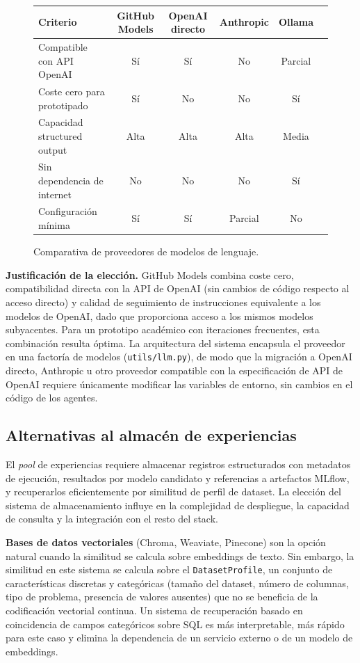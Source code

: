 \begin{figure}[H]
\centering
\begin{tabular}{lccccc}
\hline
\textbf{Criterio} & \textbf{GitHub Models} & \textbf{OpenAI directo} & \textbf{Anthropic} & \textbf{Ollama} \\
\hline
Compatible con API OpenAI & Sí & Sí & No & Parcial \\
Coste cero para prototipado & Sí & No & No & Sí \\
Capacidad structured output & Alta & Alta & Alta & Media \\
Sin dependencia de internet & No & No & No & Sí \\
Configuración mínima & Sí & Sí & Parcial & No \\
\hline
\end{tabular}
\caption{Comparativa de proveedores de modelos de lenguaje.}
\label{tab:alt-proveedor}
\end{figure}

\textbf{Justificación de la elección.} GitHub Models combina coste cero, compatibilidad directa con la API de OpenAI (sin cambios de código respecto al acceso directo) y calidad de seguimiento de instrucciones equivalente a los modelos de OpenAI, dado que proporciona acceso a los mismos modelos subyacentes. Para un prototipo académico con iteraciones frecuentes, esta combinación resulta óptima. La arquitectura del sistema encapsula el proveedor en una factoría de modelos (\texttt{utils/llm.py}), de modo que la migración a OpenAI directo, Anthropic u otro proveedor compatible con la especificación de API de OpenAI requiere únicamente modificar las variables de entorno, sin cambios en el código de los agentes.


\subsection{Alternativas al almacén de experiencias}
\label{sec:alt-experiencia}

El \emph{pool} de experiencias requiere almacenar registros estructurados con metadatos de ejecución, resultados por modelo candidato y referencias a artefactos MLflow, y recuperarlos eficientemente por similitud de perfil de dataset. La elección del sistema de almacenamiento influye en la complejidad de despliegue, la capacidad de consulta y la integración con el resto del stack.

\textbf{Bases de datos vectoriales} (Chroma, Weaviate, Pinecone) son la opción natural cuando la similitud se calcula sobre embeddings de texto. Sin embargo, la similitud en este sistema se calcula sobre el \texttt{DatasetProfile}, un conjunto de características discretas y categóricas (tamaño del dataset, número de columnas, tipo de problema, presencia de valores ausentes) que no se beneficia de la codificación vectorial continua. Un sistema de recuperación basado en coincidencia de campos categóricos sobre SQL es más interpretable, más rápido para este caso y elimina la dependencia de un servicio externo o de un modelo de embeddings.

